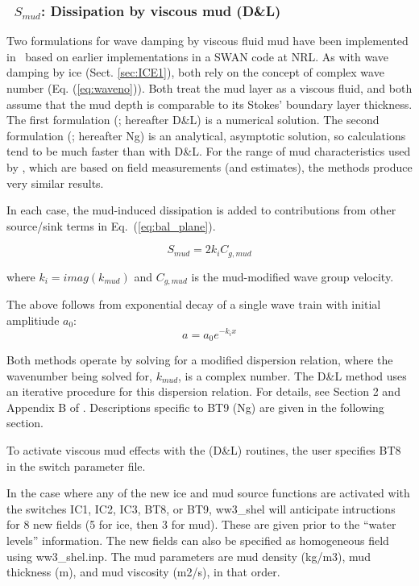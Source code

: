 \vsssub
\subsubsection{~$S_{mud}$: Dissipation by viscous mud (D\&L)} \label{sec:BT8}
\vsssub


\noindent
Two formulations for wave damping by viscous fluid mud have been implemented in \ws\, 
based on earlier implementations in a SWAN code at NRL.  As with wave damping by ice (Sect. \ref{sec:ICE1}),
both rely on the concept of complex wave number (Eq. (\ref{eq:waveno})). Both treat the mud layer as
a viscous fluid, and both assume that the mud depth is comparable to its Stokes' boundary layer thickness. The first formulation (\cite{art:DL78}; 
hereafter D\&L) is a numerical solution. 
The second formulation (\cite{art:Ng00}; hereafter Ng) is an analytical, asymptotic solution, so calculations tend to be much faster than with D\&L. For the range of mud characteristics used by \cite{art:RogHol09}, which are based on field measurements (and estimates), the methods produce very similar results.

In each case, the mud-induced dissipation is added to 
contributions from other source/sink terms in Eq.~(\ref{eq:bal_plane}).  

\begin{equation}\label{eq:dmud1}
  {S_{mud}} = 2  k_i {C_{g,mud}}
\end{equation}

\noindent
where $k_i=imag({k_{mud}})$ and ${C_{g,mud}}$ is the mud-modified wave group velocity.

The above follows from exponential decay of a single wave train with initial amplitiude $a_0$:
\begin{equation}\label{eq:dmud2}
 a=a_0e^{-k_ix}
\end{equation}

Both methods operate by solving for a modified dispersion relation, where the wavenumber being solved for, ${k_{mud}}$, is a complex number. The D\&L method uses an iterative procedure for this dispersion relation. For details, see Section 2 and Appendix B of \cite{art:DL78}. Descriptions specific to {\code BT9} (Ng) are given in the following section.

To activate viscous mud effects with the (D\&L) routines, the user specifies {\code BT8} in the switch parameter file.

In the case where any of the new ice and mud source functions are activated with the switches
 {\code IC1}, {\code IC2},  {\code IC3},  {\code BT8}, or {\code BT9}, {\file ww3\_shel} will anticipate intructions for 8 new fields (5 for ice, then 3 for mud). These are given prior to the ``water levels'' information. The new fields can also be specified as homogeneous field using {\file ww3\_shel.inp}. The mud parameters are mud density (kg/m3), mud thickness (m), and mud viscosity (m2/s), in that order.

